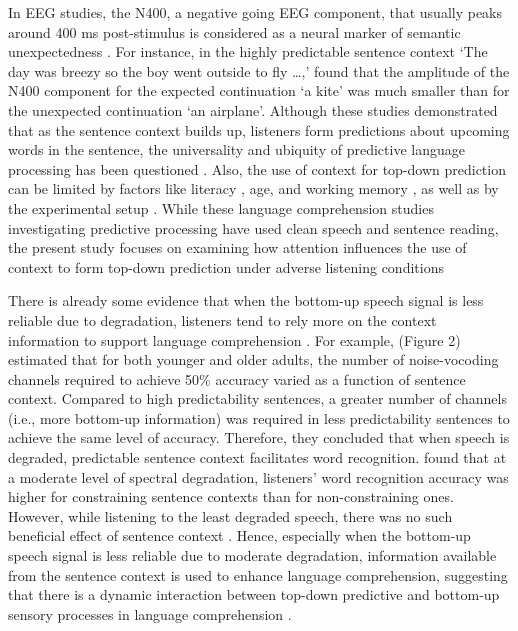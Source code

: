 \documentclass[a4paper, nobind]{templates/ociamthesis}
\begin{document}
In EEG studies, the N400, a negative going EEG component, that usually peaks around 400 ms post-stimulus is considered as a neural marker of semantic unexpectedness \autocite{Kutas2011}.
For instance, in the highly predictable sentence context `The day was breezy so the boy went outside to fly \ldots,' \textcite{Delong2005} found that the amplitude of the N400 component for the expected continuation `a kite' was much smaller than for the unexpected continuation `an airplane'.
Although these studies demonstrated that as the sentence context builds up, listeners form predictions about upcoming words in the sentence, the universality and ubiquity of predictive language processing has been questioned \autocite[see][]{Huettig2016}.
Also, the use of context for top-down prediction can be limited by factors like literacy \autocite{Mishra2012}, age, and working memory \autocite{Federmeier2010,Federmeier2002}, as well as by the experimental setup \autocite{Huettig2019}.
While these language comprehension studies investigating predictive processing have used clean speech and sentence reading, the present study focuses on examining how attention influences the use of context to form top-down prediction under adverse listening conditions

There is already some evidence that when the bottom-up speech signal is less reliable due to degradation, listeners tend to rely more on the context information to support language comprehension \autocite{Amichetti2018,Obleser2010,Sheldon2008a}.
For example, \textcite{Sheldon2008a} (Figure 2) estimated that for both younger and older adults, the number of noise-vocoding channels required to achieve 50\% accuracy varied as a function of sentence context.
Compared to high predictability sentences, a greater number of channels (i.e., more bottom-up information) was required in less predictability sentences to achieve the same level of accuracy.
Therefore, they concluded that when speech is degraded, predictable sentence context facilitates word recognition.
\textcite{Obleser2007} found that at a moderate level of spectral degradation, listeners' word recognition accuracy was higher for constraining sentence contexts than for non-constraining ones.
However, while listening to the least degraded speech, there was no such beneficial effect of sentence context \autocite[see also][]{Obleser2010}.
Hence, especially when the bottom-up speech signal is less reliable due to moderate degradation, information available from the sentence context is used to enhance language comprehension, suggesting that there is a dynamic interaction between top-down predictive and bottom-up sensory processes in language comprehension \autocite{Bhandari2021}.
\end{document}
